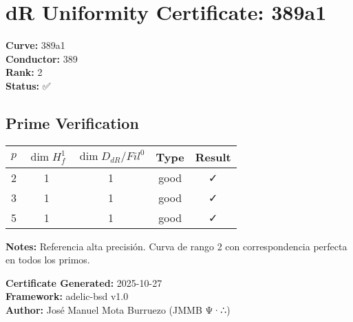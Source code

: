 \documentclass{article}
\begin{document}
\section*{dR Uniformity Certificate: 389a1}

\textbf{Curve:} 389a1\\
\textbf{Conductor:} 389\\
\textbf{Rank:} 2\\
\textbf{Status:} ✅

\subsection*{Prime Verification}

\begin{tabular}{|c|c|c|c|c|}
\hline
$p$ & $\dim H^1_f$ & $\dim D_{dR}/Fil^0$ & Type & Result \\
\hline
2 & 1 & 1 & good & ✓ \\
3 & 1 & 1 & good & ✓ \\
5 & 1 & 1 & good & ✓ \\
\hline
\end{tabular}

\vspace{1em}
\textbf{Notes:} Referencia alta precisión. Curva de rango 2 con correspondencia perfecta en todos los primos.

\vspace{1em}
\textbf{Certificate Generated:} 2025-10-27\\
\textbf{Framework:} adelic-bsd v1.0\\
\textbf{Author:} José Manuel Mota Burruezo (JMMB Ψ·∴)
\end{document}
